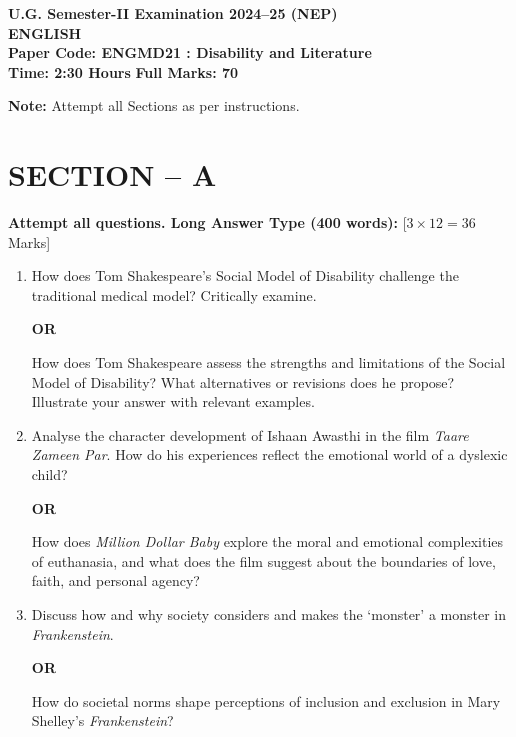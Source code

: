 \documentclass[11pt,a4paper]{article}
\begin{document}
\begin{center}
    {\Large   \textbf{U.G. Semester-II Examination 2024--25 (NEP)}}\\[4pt]
    {\large   \textbf{ENGLISH}}\\[4pt]
   \textbf{Paper Code: ENGMD21 : Disability and Literature}\\[6pt]
   \textbf{Time: 2:30 Hours} \hfill   \textbf{Full Marks: 70}
\end{center}
\hr




\noindent   \textbf{Note:} Attempt all Sections as per instructions.

\section*{SECTION -- A}



\noindent   \textbf{Attempt all questions. Long Answer Type (400 words):} \hfill [$3  \times 12 = 36$ Marks]


\begin{enumerate}[label=   \textbf{\arabic*.}]
    \item How does Tom Shakespeare's Social Model of Disability challenge the traditional medical model? Critically examine.
    
\begin{center}   \textbf{OR}\end{center}
    How does Tom Shakespeare assess the strengths and limitations of the Social Model of Disability? What alternatives or revisions does he propose? Illustrate your answer with relevant examples.

    \item Analyse the character development of Ishaan Awasthi in the film   \textit{Taare Zameen Par}. How do his experiences reflect the emotional world of a dyslexic child?
    
\begin{center}   \textbf{OR}\end{center}
    How does   \textit{Million Dollar Baby} explore the moral and emotional complexities of euthanasia, and what does the film suggest about the boundaries of love, faith, and personal agency?

    \item Discuss how and why society considers and makes the `monster' a monster in   \textit{Frankenstein}.
    
\begin{center}   \textbf{OR}\end{center}
    How do societal norms shape perceptions of inclusion and exclusion in Mary Shelley's   \textit{Frankenstein}?
\end{enumerate}
\end{document}
